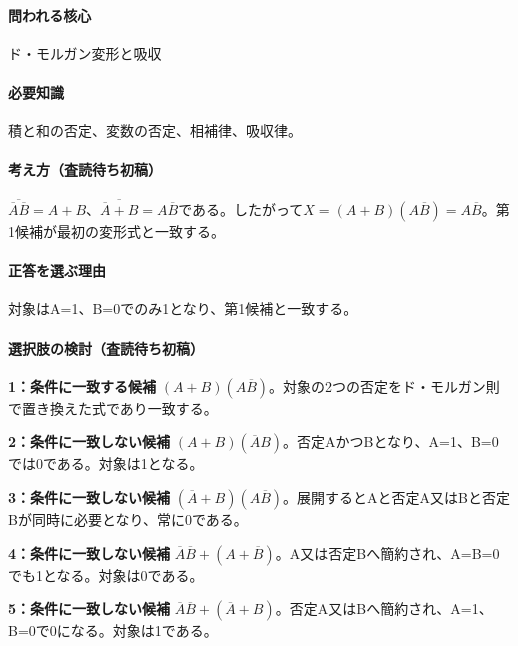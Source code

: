 \paragraph{問われる核心} ド・モルガン変形と吸収

\paragraph{必要知識} 積と和の否定、変数の否定、相補律、吸収律。

\paragraph{考え方（査読待ち初稿）} \(\overline{\overline A\overline B}=A+B\)、\(\overline{\overline A+B}=A\overline B\)である。したがって\(X=(A+B)(A\overline B)=A\overline B\)。第1候補が最初の変形式と一致する。

\paragraph{正答を選ぶ理由} 対象はA=\allowbreak{}1、B=\allowbreak{}0でのみ1となり、第1候補と一致する。

\paragraph{選択肢の検討（査読待ち初稿）}\mbox{}\par

\noindent\textbf{1：条件に一致する候補} \((A+B)(A\overline B)\)。対象の2つの否定をド・モルガン則で置き換えた式であり一致する。\par

\noindent\textbf{2：条件に一致しない候補} \((A+B)(\overline A B)\)。否定AかつBとなり、A=\allowbreak{}1、B=\allowbreak{}0では0である。対象は1となる。\par

\noindent\textbf{3：条件に一致しない候補} \((\overline A+B)(A\overline B)\)。展開するとAと否定A又はBと否定Bが同時に必要となり、常に0である。\par

\noindent\textbf{4：条件に一致しない候補} \(\overline A\overline B+(A+\overline B)\)。A又は否定Bへ簡約され、A=\allowbreak{}B=\allowbreak{}0でも1となる。対象は0である。\par

\noindent\textbf{5：条件に一致しない候補} \(\overline A\overline B+(\overline A+B)\)。否定A又はBへ簡約され、A=\allowbreak{}1、B=\allowbreak{}0で0になる。対象は1である。\par

